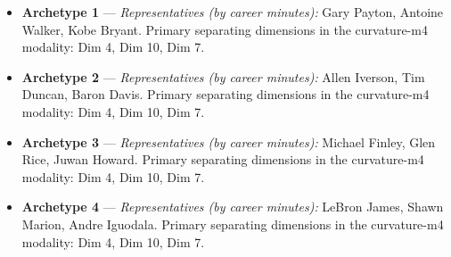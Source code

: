 \begin{itemize}
\item \textbf{Archetype 1} --- \emph{Representatives (by career minutes):} Gary Payton, Antoine Walker, Kobe Bryant. Primary separating dimensions in the curvature-m4 modality: Dim 4, Dim 10, Dim 7.
\item \textbf{Archetype 2} --- \emph{Representatives (by career minutes):} Allen Iverson, Tim Duncan, Baron Davis. Primary separating dimensions in the curvature-m4 modality: Dim 4, Dim 10, Dim 7.
\item \textbf{Archetype 3} --- \emph{Representatives (by career minutes):} Michael Finley, Glen Rice, Juwan Howard. Primary separating dimensions in the curvature-m4 modality: Dim 4, Dim 10, Dim 7.
\item \textbf{Archetype 4} --- \emph{Representatives (by career minutes):} LeBron James, Shawn Marion, Andre Iguodala. Primary separating dimensions in the curvature-m4 modality: Dim 4, Dim 10, Dim 7.
\end{itemize}
